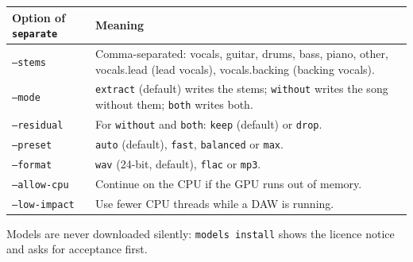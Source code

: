 \documentclass{covermaker}
\begin{document}
\begin{tabularx}{\linewidth}{@{}lY@{}}
\toprule
\textbf{Option of \texttt{separate}} & \textbf{Meaning} \\
\midrule
\texttt{--stems} & Comma-separated: vocals, guitar, drums, bass, piano, other, vocals.lead (lead vocals), vocals.backing (backing vocals). \\
\texttt{--mode} & \texttt{extract} (default) writes the stems; \texttt{without} writes the song without them; \texttt{both} writes both. \\
\texttt{--residual} & For \texttt{without} and \texttt{both}: \texttt{keep} (default) or \texttt{drop}. \\
\texttt{--preset} & \texttt{auto} (default), \texttt{fast}, \texttt{balanced} or \texttt{max}. \\
\texttt{--format} & \texttt{wav} (24-bit, default), \texttt{flac} or \texttt{mp3}. \\
\texttt{--allow-cpu} & Continue on the CPU if the GPU runs out of memory. \\
\texttt{--low-impact} & Use fewer CPU threads while a DAW is running. \\
\bottomrule
\end{tabularx}

Models are never downloaded silently: \texttt{models install} shows the licence
notice and asks for acceptance first.

\printnoidxglossaries
\end{document}
